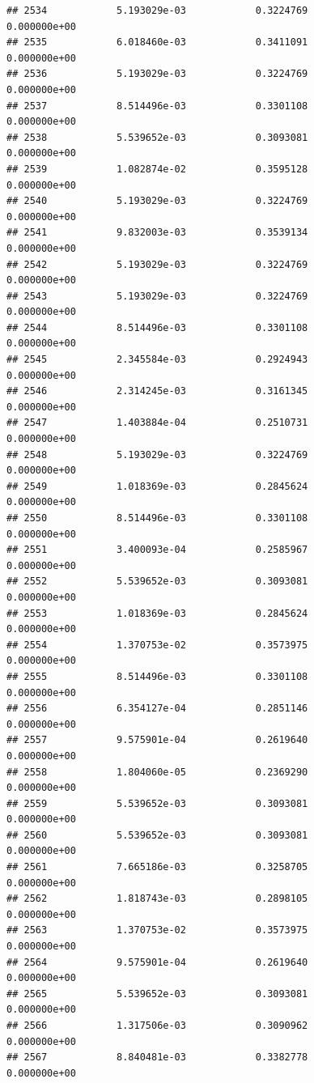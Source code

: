 \documentclass[
]{article}
\begin{document}
\begin{verbatim}
## 2534            5.193029e-03            0.3224769            0.000000e+00
## 2535            6.018460e-03            0.3411091            0.000000e+00
## 2536            5.193029e-03            0.3224769            0.000000e+00
## 2537            8.514496e-03            0.3301108            0.000000e+00
## 2538            5.539652e-03            0.3093081            0.000000e+00
## 2539            1.082874e-02            0.3595128            0.000000e+00
## 2540            5.193029e-03            0.3224769            0.000000e+00
## 2541            9.832003e-03            0.3539134            0.000000e+00
## 2542            5.193029e-03            0.3224769            0.000000e+00
## 2543            5.193029e-03            0.3224769            0.000000e+00
## 2544            8.514496e-03            0.3301108            0.000000e+00
## 2545            2.345584e-03            0.2924943            0.000000e+00
## 2546            2.314245e-03            0.3161345            0.000000e+00
## 2547            1.403884e-04            0.2510731            0.000000e+00
## 2548            5.193029e-03            0.3224769            0.000000e+00
## 2549            1.018369e-03            0.2845624            0.000000e+00
## 2550            8.514496e-03            0.3301108            0.000000e+00
## 2551            3.400093e-04            0.2585967            0.000000e+00
## 2552            5.539652e-03            0.3093081            0.000000e+00
## 2553            1.018369e-03            0.2845624            0.000000e+00
## 2554            1.370753e-02            0.3573975            0.000000e+00
## 2555            8.514496e-03            0.3301108            0.000000e+00
## 2556            6.354127e-04            0.2851146            0.000000e+00
## 2557            9.575901e-04            0.2619640            0.000000e+00
## 2558            1.804060e-05            0.2369290            0.000000e+00
## 2559            5.539652e-03            0.3093081            0.000000e+00
## 2560            5.539652e-03            0.3093081            0.000000e+00
## 2561            7.665186e-03            0.3258705            0.000000e+00
## 2562            1.818743e-03            0.2898105            0.000000e+00
## 2563            1.370753e-02            0.3573975            0.000000e+00
## 2564            9.575901e-04            0.2619640            0.000000e+00
## 2565            5.539652e-03            0.3093081            0.000000e+00
## 2566            1.317506e-03            0.3090962            0.000000e+00
## 2567            8.840481e-03            0.3382778            0.000000e+00

\end{verbatim}
\end{document}
